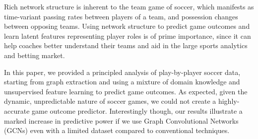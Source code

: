 Rich network structure is inherent to the team game of soccer, which
manifests as time-variant passing rates between players of a team,
and possession changes between opposing teams. Using network structure to predict
game outcomes and learn latent features representing player roles is of prime importance,
since it can help coaches better understand their teams and aid in the large sports
analytics and betting market.

In this paper, we provided a principled analysis of play-by-player soccer
data, starting from graph extraction and using a mixture of domain knowledge and 
unsupervised feature learning to predict game outcomes. As expected, given the
dynamic, unpredictable nature of soccer games, we could not create a highly-accurate
game outcome predictor. Interestingly though, our results illustrate a marked increase
in predictive power if we use Graph Convolutional Networks (GCNs) even with a limited
dataset compared to conventional techniques.

